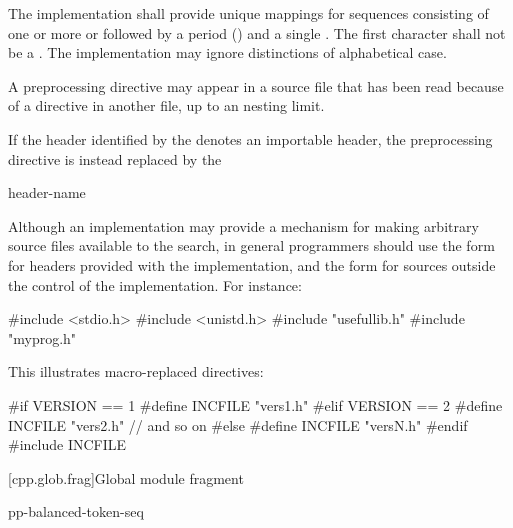 \pnum
The implementation shall provide unique mappings for
sequences consisting of one or more
 or 
followed by a period
()
and a single
.
The first character shall not be a .
The implementation may ignore distinctions of alphabetical case.

\pnum
A
preprocessing directive may appear
in a source file that has been read because of a
directive in another file,
up to an  nesting limit.

\pnum
If the header identified by the 
denotes an importable header,
the preprocessing directive
is instead replaced by the 
\begin{ncbnf}
 header-name \terminal{;}
\end{ncbnf}

\pnum
\begin{note}
Although an implementation may provide a mechanism for making arbitrary
source files available to the \tcode{< >} search, in general
programmers should use the \tcode{< >} form for headers provided
with the implementation, and the  form for sources
outside the control of the implementation. For instance:

\begin{codeblock}
#include <stdio.h>
#include <unistd.h>
#include "usefullib.h"
#include "myprog.h"
\end{codeblock}

\end{note}

\pnum
\begin{example}
This illustrates macro-replaced
directives:

\begin{codeblock}
#if VERSION == 1
    #define INCFILE  "vers1.h"
#elif VERSION == 2
    #define INCFILE  "vers2.h"  // and so on
#else
    #define INCFILE  "versN.h"
#endif
#include INCFILE
\end{codeblock}
\end{example}

[cpp.glob.frag]{Global module fragment}

\begin{bnf}
\br
     \terminal{;} pp-balanced-token-seq 
\end{bnf}

